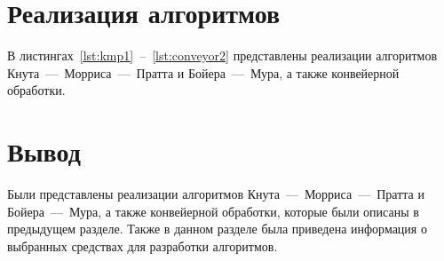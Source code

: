 \section{Реализация алгоритмов}

В листингах~\ref{lst:kmp1}~--~\ref{lst:conveyor2} представлены реализации алгоритмов Кнута~---~Морриса~---~Пратта и Бойера~---~Мура, а также конвейерной обработки.















\section{Вывод}

Были представлены реализации алгоритмов Кнута~---~Морриса~---~Пратта и Бойера~---~Мура, а также конвейерной обработки, которые были описаны в предыдущем разделе. Также в данном разделе была приведена информация о выбранных средствах для разработки алгоритмов.